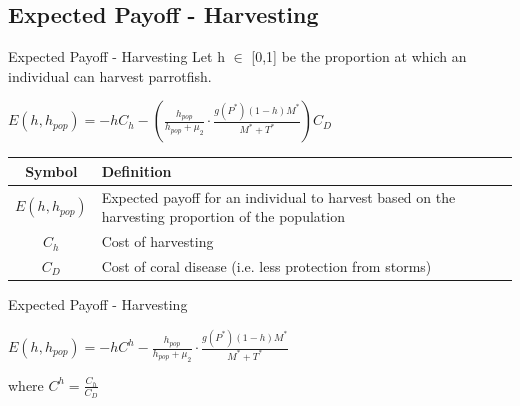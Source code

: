 \documentclass{beamer}
\begin{document}
\subsection{Expected Payoff - Harvesting}
\begin{frame}{Expected Payoff - Harvesting}
    Let h $\in$ [0,1] be the proportion at which an individual can harvest parrotfish.
    \begin{center}
    $\displaystyle {E(h, h_{pop}) = -hC_{h} - \left( \frac{h_{pop}}{h_{pop} + \mu_{2}} \cdot \frac{g(P^{*})(1-h)M^{*}}{M^{*} + T^{*}} \right) C_{D}}$ \\
    
    \vspace{0.6cm}
    
    \begin{table}[H]
        \centering
        \begin{tabular}{c|p{8cm}}
             Symbol & Definition \\
             \hline
             $E(h, h_{pop})$ & Expected payoff for an individual to harvest based on the harvesting proportion of the population \\
             $C_{h}$ & Cost of harvesting \\
             $C_{D}$ & Cost of coral disease (i.e. less protection from storms)\\
        \end{tabular}
        \label{tab:my_label}
    \end{table}
    \end{center}
\end{frame}

\begin{frame}{Expected Payoff - Harvesting}
    \begin{center}
    $\displaystyle {E(h, h_{pop}) = -hC^{h} - \frac{h_{pop}}{h_{pop} + \mu_{2}} \cdot \frac{g(P^{*})(1-h)M^{*}}{M^{*} + T^{*}}}$ \\
    
    \vspace{0.6cm}
    
    where $C^{h} = \frac{C_{h}}{C_{D}}$
    \end{center}
\end{frame}
\end{document}
